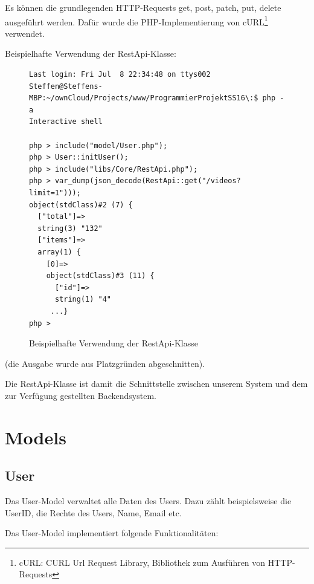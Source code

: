 Es können die grundlegenden HTTP-Requests get, post, patch, put, delete ausgeführt werden. Dafür wurde die PHP-Implementierung von cURL\footnote{cURL: CURL Url Request Library, Bibliothek zum Ausführen von HTTP-Requests} verwendet.

\pm

Beispielhafte Verwendung der RestApi-Klasse:

\begin{figure}[H]
	\begin{lstlisting}
Last login: Fri Jul  8 22:34:48 on ttys002
Steffen@Steffens-MBP:~/ownCloud/Projects/www/ProgrammierProjektSS16\:$ php -a
Interactive shell

php > include("model/User.php");
php > User::initUser();
php > include("libs/Core/RestApi.php");
php > var_dump(json_decode(RestApi::get("/videos?limit=1")));
object(stdClass)#2 (7) {
  ["total"]=>
  string(3) "132"
  ["items"]=>
  array(1) {
    [0]=>
    object(stdClass)#3 (11) {
      ["id"]=>
      string(1) "4"
     ...}
php > 
	\end{lstlisting}
	\caption{Beispielhafte Verwendung der RestApi-Klasse}
\end{figure}

(die Ausgabe wurde aus Platzgründen abgeschnitten).

\pm

Die RestApi-Klasse ist damit die Schnittstelle zwischen unserem System und dem zur Verfügung gestellten Backendsystem.

\section{Models}

\subsection{User}

Das User-Model verwaltet alle Daten des Users. Dazu zählt beispielsweise die UserID, die Rechte des Users, Name, Email etc.

\pm

Das User-Model implementiert folgende Funktionalitäten:

